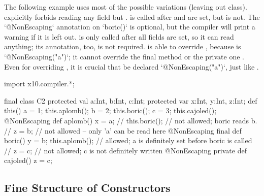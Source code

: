 The following example uses most of the possible variations (leaving out
 class).   explicitly forbids reading any field but
.  is called after  and  are set, but
 is not. 
The \xcd`@NonEscaping` annotation on \xcd`boric()` is optional, but the
compiler will print a warning if it is left out.
 is only called after all fields are set, so it
can read anything; its annotation, too, is not required.    is able to override , because
 is \xcd`@NonEscaping("a")`; it cannot override the final method
 or the private one .  Even for overriding
, it is crucial that  be 
declared \xcd`@NonEscaping("a")`, just like .
\begin{xten}
import x10.compiler.*;

final class C2 {
  protected val a:Int, b:Int, c:Int;
  protected var x:Int, y:Int, z:Int;
  def this() {
    a = 1;
    this.aplomb();
    b = 2;
    this.boric();
    c = 3;
    this.cajoled();
  }
  @NonEscaping def aplomb() {
    x = a;
    // this.boric(); // not allowed; boric reads b.
    // z = b; // not allowed -- only 'a' can be read here
  }
  @NonEscaping final def boric() {
    y = b;
    this.aplomb(); // allowed; a is definitely set before boric is called
    // z = c; // not allowed; c is not definitely written 
  }
  @NonEscaping private def cajoled() {
    z = c;
  }  
}

\end{xten}
%



\subsection{Fine Structure of Constructors}
\label{SFineStructCtors}

